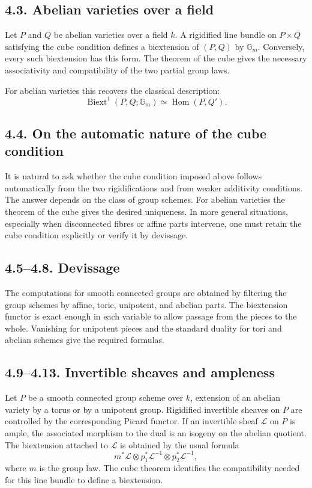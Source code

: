 \documentclass[11pt]{article}
\theoremstyle{plain}
\theoremstyle{definition}
\theoremstyle{remark}
\DeclareMathOperator{\Hom}{Hom}
\DeclareMathOperator{\Biext}{Biext}
\newcommand{\Gm}{\mathbb G_m}
\begin{document}
\subsection*{4.3. Abelian varieties over a field}

Let \(P\) and \(Q\) be abelian varieties over a field \(k\). A rigidified line
bundle on \(P\times Q\) satisfying the cube condition defines a biextension of
\((P,Q)\) by \(\Gm\). Conversely, every such biextension has this form. The
theorem of the cube gives the necessary associativity and compatibility of the
two partial group laws.

For abelian varieties this recovers the classical description:
\[
\Biext^1(P,Q;\Gm)\simeq \Hom(P,Q').
\]

\subsection*{4.4. On the automatic nature of the cube condition}

It is natural to ask whether the cube condition imposed above follows
automatically from the two rigidifications and from weaker additivity
conditions. The answer depends on the class of group schemes. For abelian
varieties the theorem of the cube gives the desired uniqueness. In more general
situations, especially when disconnected fibres or affine parts intervene, one
must retain the cube condition explicitly or verify it by devissage.

\subsection*{4.5--4.8. Devissage}

The computations for smooth connected groups are obtained by filtering the group
schemes by affine, toric, unipotent, and abelian parts. The biextension functor
is exact enough in each variable to allow passage from the pieces to the whole.
Vanishing for unipotent pieces and the standard duality for tori and abelian
schemes give the required formulas.

\subsection*{4.9--4.13. Invertible sheaves and ampleness}

Let \(P\) be a smooth connected group scheme over \(k\), extension of an abelian
variety by a torus or by a unipotent group. Rigidified invertible sheaves on
\(P\) are controlled by the corresponding Picard functor. If an invertible sheaf
\(\mathcal L\) on \(P\) is ample, the associated morphism to the dual is an
isogeny on the abelian quotient. The biextension attached to \(\mathcal L\) is
obtained by the usual formula
\[
m^*\mathcal L\otimes p_1^*\mathcal L^{-1}\otimes p_2^*\mathcal L^{-1},
\]
where \(m\) is the group law. The cube theorem identifies the compatibility
needed for this line bundle to define a biextension.
\end{document}
